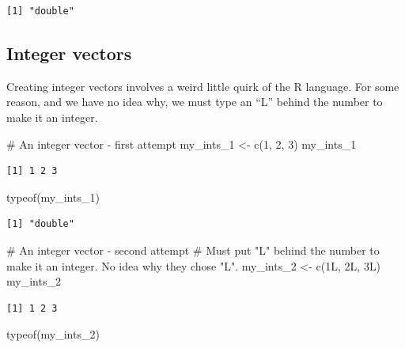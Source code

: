 \documentclass[
  letterpaper,
  DIV=11,
  numbers=noendperiod]{scrreprt}
\newenvironment{Shaded}{\begin{snugshade}}{\end{snugshade}}
\newcommand{\CommentTok}[1]{\textcolor[rgb]{0.37,0.37,0.37}{#1}}
\newcommand{\DecValTok}[1]{\textcolor[rgb]{0.68,0.00,0.00}{#1}}
\newcommand{\FunctionTok}[1]{\textcolor[rgb]{0.28,0.35,0.67}{#1}}
\newcommand{\NormalTok}[1]{\textcolor[rgb]{0.00,0.23,0.31}{#1}}
\newcommand{\OtherTok}[1]{\textcolor[rgb]{0.00,0.23,0.31}{#1}}
\begin{document}
\begin{verbatim}
[1] "double"
\end{verbatim}

\subsection{Integer vectors}\label{integer-vectors}

Creating integer vectors involves a weird little quirk of the R
language. For some reason, and we have no idea why, we must type an
``L'' behind the number to make it an integer.

\begin{Shaded}
\begin{Highlighting}[]
\CommentTok{\# An integer vector {-} first attempt}
\NormalTok{my\_ints\_1 }\OtherTok{\textless{}{-}} \FunctionTok{c}\NormalTok{(}\DecValTok{1}\NormalTok{, }\DecValTok{2}\NormalTok{, }\DecValTok{3}\NormalTok{)}
\NormalTok{my\_ints\_1}
\end{Highlighting}
\end{Shaded}

\begin{verbatim}
[1] 1 2 3
\end{verbatim}

\begin{Shaded}
\begin{Highlighting}[]
\FunctionTok{typeof}\NormalTok{(my\_ints\_1)}
\end{Highlighting}
\end{Shaded}

\begin{verbatim}
[1] "double"
\end{verbatim}

\begin{Shaded}
\begin{Highlighting}[]
\CommentTok{\# An integer vector {-} second attempt}
\CommentTok{\# Must put "L" behind the number to make it an integer. No idea why they chose "L".}
\NormalTok{my\_ints\_2 }\OtherTok{\textless{}{-}} \FunctionTok{c}\NormalTok{(}\DecValTok{1}\NormalTok{L, }\DecValTok{2}\NormalTok{L, }\DecValTok{3}\NormalTok{L)}
\NormalTok{my\_ints\_2}
\end{Highlighting}
\end{Shaded}

\begin{verbatim}
[1] 1 2 3
\end{verbatim}

\begin{Shaded}
\begin{Highlighting}[]
\FunctionTok{typeof}\NormalTok{(my\_ints\_2)}
\end{Highlighting}
\end{Shaded}
\end{document}
